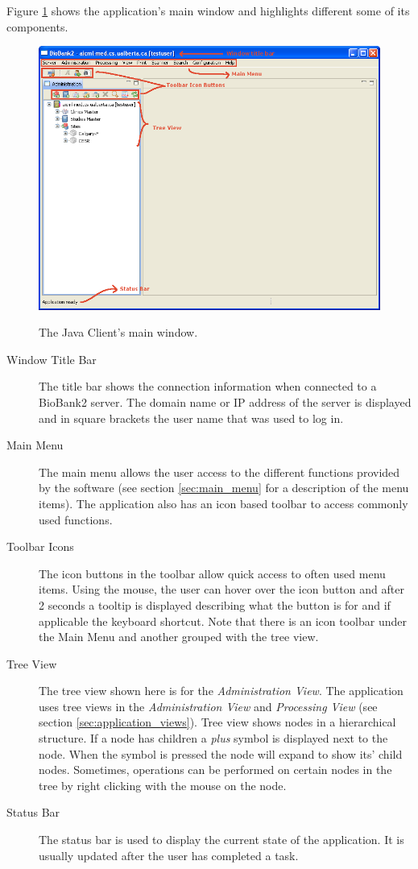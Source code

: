 Figure \ref{fig:main_window} shows the application's main window and highlights
different some of its components.
    \begin{figure}[H]
      \centering
      \scalebox{0.4}
      { \includegraphics*{screenshots/overview/main_window} }
      \caption{The Java Client's main window.}
      \label{fig:main_window}
    \end{figure}
\begin{description}
  \item[Window Title Bar] The title bar shows the connection information when
    connected to a BioBank2 server. The domain name or IP address of the server
    is displayed and in square brackets the user name that was used to log in.
  \item[Main Menu] The main menu allows the user access to the different
    functions provided by the software (see section \ref{sec:main_menu} for a
    description of the menu items). The application also has an icon based
    toolbar to access commonly used functions.
  \item[Toolbar Icons] The icon buttons in the toolbar allow quick access to
    often used menu items. Using the mouse, the user can hover over the icon
    button and after 2 seconds a tooltip is displayed describing what the
    button is for and if applicable the keyboard shortcut. Note that there is
    an icon toolbar under the Main Menu and another grouped with the tree view.
  \item[Tree View] The tree view shown here is for the \emph{Administration
    View}. The application uses tree views in the \emph{Administration View}
    and \emph{Processing View} (see section \ref{sec:application_views}). Tree
    view shows nodes in a hierarchical structure. If a node has children a
    \emph{plus} symbol is displayed next to the node. When the symbol is
    pressed the node will expand to show its' child nodes.  Sometimes,
    operations can be performed on certain nodes in the tree by right clicking
    with the mouse on the node.
  \item[Status Bar] The status bar is used to display the current state of the
    application. It is usually updated after the user has completed a task.
\end{description}

